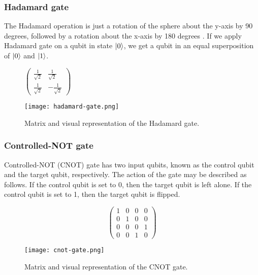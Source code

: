 \subsubsection{Hadamard gate}
The Hadamard operation is just a rotation of the sphere about the y-axis by 90 degrees, followed by a rotation about the x-axis by 180 degrees \cite{qc}. If we apply Hadamard gate on a qubit in state $\lvert0\rangle$, we get a qubit in an equal superposition of $\lvert0\rangle$ and $\lvert1\rangle$.
\begin{figure}[H]
    \centering
    \begin{minipage}{0.4\linewidth}
      \centering
      $\begin{pmatrix} 
        \frac{1}{\sqrt{2}} &  \frac{1}{\sqrt{2}}  \\
        \frac{1}{\sqrt{2}}  &  -\frac{1}{\sqrt{2}} 
        \end{pmatrix}$
      \vfill
    \end{minipage}
    \begin{minipage}{0.25\linewidth}
      \centering
      \texttt{[image: hadamard-gate.png]}
      \vfill
    \end{minipage}
    \caption{Matrix and visual representation of the Hadamard gate.}
\end{figure}

\subsubsection{Controlled-NOT gate} 
Controlled-NOT (CNOT) gate has two input qubits, known as the control qubit and the target qubit, respectively. The action of the gate may be described as follows. If the control qubit is set to 0, then the target qubit is left alone. If the control qubit is set to 1, then the target qubit is flipped. \cite{qc}

\begin{figure}[H]
  \centering
  \begin{minipage}{0.4\linewidth}
    \centering
    $$\begin{pmatrix}
      1 & 0 & 0 & 0 \\
      0 & 1 & 0 & 0 \\
      0 & 0 & 0 & 1 \\
      0 & 0 & 1 & 0
  \end{pmatrix}$$
    \vfill
  \end{minipage}
  \begin{minipage}{0.25\linewidth}
    \centering
    \texttt{[image: cnot-gate.png]}
    \vfill
  \end{minipage}
  \caption{Matrix and visual representation of the CNOT gate.}
\end{figure}

